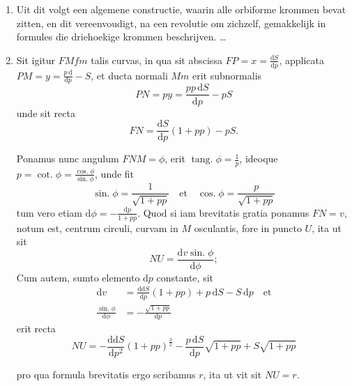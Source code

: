 \documentclass[10pt,a4paper]{article}
\newcommand{\switchenum}{\setcounter{enumi}{\arabic{enumi}-1}\switchcolumn}
\DeclareMathOperator{\tang}{tang.}
\DeclareMathOperator{\cotg}{cot.}
\DeclareMathOperator{\sing}{sin.}
\DeclareMathOperator{\cosg}{cos.}
\def\D{\mathrm{d}}
\begin{document}
\begin{paracol}{2}
\begin{enumerate}[topsep=1px]
		\switchenum
		\item Uit dit volgt een algemene constructie, waarin alle orbiforme krommen bevat zitten, en dit vereenvoudigt, na een revolutie om zichzelf, gemakkelijk in formules die driehoekige krommen beschrijven. \ldots 
		\switchcolumn*
		
		\item Sit igitur $FMfm$ talis curvas, in qua sit abscissa $FP=x=\frac{\D S}{\D p}$, applicata $PM=y=\frac{p\,\D }{\D p}-S$, et ducta normali $Mm$ erit subnormalis
		\[
			PN = py = \frac{pp\,\D S}{\D p}-pS
		\]
		unde sit recta
		\[
			FN = \frac{\D S}{\D p}(1+pp)-pS.
		\]
		\par Ponamus nunc angulum $FNM = \phi$, erit $\tang \phi = \frac{1}{p}$, ideoque $p=\cotg \phi = \frac{\cosg \phi}{\sing \phi}$, unde fit
		\[
			\sing \phi = \frac{1}{\sqrt{1+pp}} \quad \text{et} \quad \cosg \phi = \frac{p}{\sqrt{1+pp}}
		\]
		tum vero etiam $\D \phi = -\frac{\D p}{1+pp}$. Quod si iam brevitatis gratia ponamus $FN=v$, notum est, centrum circuli, curvam in $M$ osculantis, fore in puncto $U$, ita ut sit
		\[
			NU = \frac{\D v\sing \phi}{\D \phi};
		\]
		Cum autem, sumto elemento $\D p$ constante, sit
		\begin{align*}
			\D  v &= \frac{\D \D  S}{\D p}(1+pp)+p\,\D S-S\,\D p \quad \text{et}\\
			\frac{\sing \phi}{\D \phi} &= -\frac{\sqrt{1+pp}}{\D p}
		\end{align*}
		erit recta
		\[
			NU = -\frac{\D\D S}{\D p^2} (1+pp)^{\frac{3}{2}}-\frac{p\,\D S}{\D p} \sqrt{1+pp} + S\sqrt{1+pp}
		\]
		\par pro qua formula brevitatis ergo scribamus $r$, ita ut vit sit $NU=r$.
		

\end{enumerate}
\end{paracol}
\end{document}
